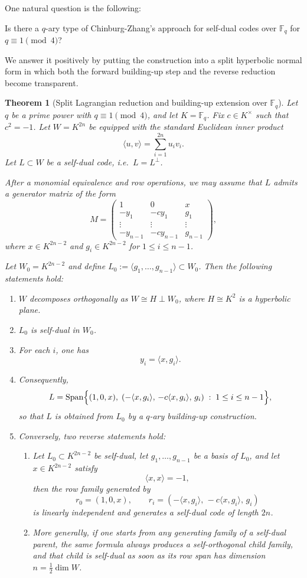 \documentclass[12pt]{article}
\newtheorem{theorem}{Theorem}[section]
\newenvironment{blueblock}{\begingroup\color{blue}}{\endgroup}
\begin{document}
One natural question is the following:

Is there a  $q$-ary type of Chinburg-Zhang's approach for self-dual codes over $\mathbb F_q$ for $q \equiv 1 \pmod{4}$?

We answer it positively by putting the construction into a split hyperbolic normal form in which both the forward building-up step and the reverse reduction become transparent.

\begin{theorem}[Split Lagrangian reduction and building-up extension over $\mathbb{F}_q$]\label{thm:qary-building-up}
Let $q$ be a prime power with $q \equiv 1 \pmod{4}$, and let $K=\mathbb{F}_q$.
Fix $c \in K^\times$ such that $c^2=-1$.
Let $W=K^{2n}$ be equipped with the standard Euclidean inner product
\[
\langle u,v\rangle = \sum_{i=1}^{2n} u_i v_i.
\]
Let $L \subset W$ be a self-dual code, i.e.\ $L=L^\perp$.

After a monomial equivalence and row operations, we may assume that $L$ admits a generator matrix of the form
\[
M=
\begin{pmatrix}
1 & 0 & x\\
-y_1 & -c y_1 & g_1\\
\vdots & \vdots & \vdots\\
-y_{n-1} & -c y_{n-1} & g_{n-1}
\end{pmatrix},
\]
where $x \in K^{2n-2}$ and $g_i \in K^{2n-2}$ for $1 \le i \le n-1$.

Let $W_0 = K^{2n-2}$ and define $L_0 := \langle g_1,\dots,g_{n-1}\rangle \subset W_0$.
Then the following statements hold:
\begin{enumerate}
\item $W$ decomposes orthogonally as $W \cong H \perp W_0$, where $H \cong K^2$ is a hyperbolic plane.
\item $L_0$ is self-dual in $W_0$.
\item For each $i$, one has
\[
y_i = \langle x, g_i\rangle.
\]
\item Consequently,
\[
L = \operatorname{Span}\Bigl\{(1,0,x),\;
(-\langle x,g_i\rangle,\,-c\langle x,g_i\rangle,\,g_i)\;:\;1 \le i \le n-1\Bigr\},
\]
so that $L$ is obtained from $L_0$ by a $q$-ary building-up construction.
\item Conversely, two reverse statements hold:
\begin{enumerate}[label=(5\alph*)]
\item Let $L_0 \subset K^{2n-2}$ be self-dual, let $g_1,\dots,g_{n-1}$ be a basis of $L_0$, and let $x \in K^{2n-2}$ satisfy
\[
\langle x,x\rangle = -1,
\]
then the row family generated by
\[
r_0 = (1,0,x), \qquad
r_i = (-\langle x,g_i\rangle,\,-c\langle x,g_i\rangle,\,g_i)
\]
is linearly independent and generates a self-dual code of length $2n$.
\item More generally, if one starts from any generating family of a self-dual parent, the same formula always produces a self-orthogonal child family, and that child is self-dual as soon as its row span has dimension $n=\frac12 \dim W$.
\end{enumerate}
\end{enumerate}
\end{theorem}
\end{document}
